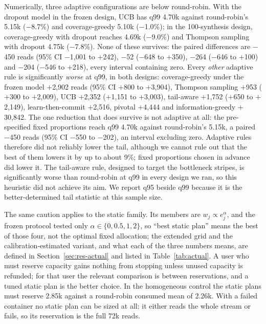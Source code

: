 \documentclass[conference,onecolumn,11pt]{IEEEtran}
\begin{document}
Numerically, three adaptive configurations are below round-robin.  With the dropout model in the
frozen design, UCB has q99 4.70k against round-robin's 5.15k ($-$8.7\%) and coverage-greedy 5.10k
($-$1.0\%); in the 100-synthesis design, coverage-greedy with dropout reaches 4.69k ($-$9.0\%) and
Thompson sampling with dropout 4.75k ($-$7.8\%).  None of these survives: the paired differences are
$-$450 reads (95\% CI $-$1{,}001 to $+$242), $-$52 ($-$648 to $+$350), $-$264 ($-$646 to $+$100) and
$-$204 ($-$546 to $+$218), every interval containing zero.  Every \emph{other} adaptive rule is
significantly \emph{worse} at q99, in both designs: coverage-greedy under the frozen model $+$2{,}902
reads (95\% CI $+$800 to $+$3{,}904), Thompson sampling $+$953 ($+$300 to $+$2{,}009), UCB $+$2{,}352
($+$1{,}151 to $+$3{,}003), tail-aware $+$1{,}752 ($+$650 to $+$2{,}149), learn-then-commit $+$2{,}516,
pivotal $+$4{,}444 and information-greedy $+$30{,}842.  The one reduction that does survive is not
adaptive at all: the pre-specified fixed proportions reach q99 4.70k against round-robin's 5.15k, a
paired $-$450 reads (95\% CI $-$550 to $-$202), an interval excluding zero.  Adaptive rules therefore
did not reliably lower the tail, although we cannot rule out that the best of them lowers it by up to
about 9\%; fixed proportions chosen in advance did lower it.  The tail-aware rule, designed to target
the bottleneck stripes, is significantly worse than round-robin at q99 in every design we ran, so this
heuristic did not achieve its aim.  We report q95 beside q99 because it is the better-determined tail
statistic at this sample size.

The same caution applies to the static family.  Its members are $w_j\propto e_j^{\alpha}$, and the frozen
protocol tested only $\alpha\in\{0,0.5,1,2\}$, so ``best static plan'' means the best of those four,
not the optimal fixed allocation; the extended grid and the calibration-estimated variant, and what
each of the three numbers means, are defined in Section~\ref{sec:res-actual} and listed in
Table~\ref{tab:actual}.  A user who must reserve capacity gains nothing from stopping
unless unused capacity is refunded; for that user the relevant comparison is between reservations, and
a tuned static plan is the better choice.  In the homogeneous control the static plans must reserve
2.85k against a round-robin consumed mean of 2.26k.  With a failed container no static plan can be
sized at all: it either reads the whole stream or fails, so its reservation is the full 72k reads.
\end{document}
